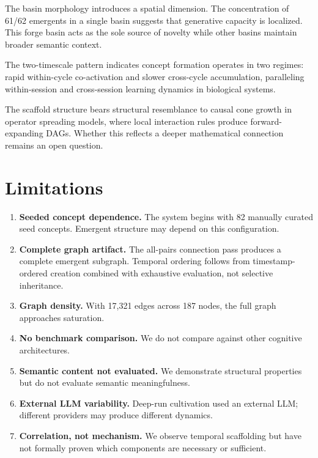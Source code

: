 \documentclass[11pt]{article}
\begin{document}
The basin morphology introduces a spatial dimension. The concentration of 61/62 emergents in a single basin suggests that generative capacity is localized. This forge basin acts as the sole source of novelty while other basins maintain broader semantic context.

The two-timescale pattern indicates concept formation operates in two regimes: rapid within-cycle co-activation and slower cross-cycle accumulation, paralleling within-session and cross-session learning dynamics in biological systems.

The scaffold structure bears structural resemblance to causal cone growth in operator spreading models, where local interaction rules produce forward-expanding DAGs. Whether this reflects a deeper mathematical connection remains an open question.

\section{Limitations}

\begin{enumerate}
\item \textbf{Seeded concept dependence.} The system begins with 82 manually curated seed concepts. Emergent structure may depend on this configuration.
\item \textbf{Complete graph artifact.} The all-pairs connection pass produces a complete emergent subgraph. Temporal ordering follows from timestamp-ordered creation combined with exhaustive evaluation, not selective inheritance.
\item \textbf{Graph density.} With 17,321 edges across 187 nodes, the full graph approaches saturation.
\item \textbf{No benchmark comparison.} We do not compare against other cognitive architectures.
\item \textbf{Semantic content not evaluated.} We demonstrate structural properties but do not evaluate semantic meaningfulness.
\item \textbf{External LLM variability.} Deep-run cultivation used an external LLM; different providers may produce different dynamics.
\item \textbf{Correlation, not mechanism.} We observe temporal scaffolding but have not formally proven which components are necessary or sufficient.
\end{enumerate}
\end{document}
